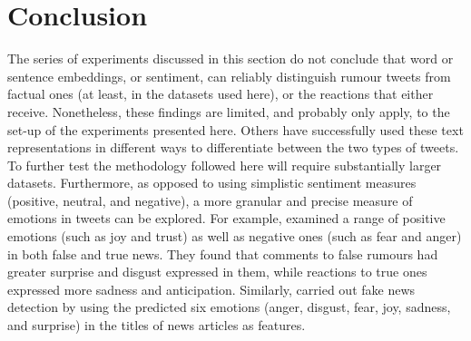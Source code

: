 \section{Conclusion}
\label{ssec:3-conclusion}

The series of experiments discussed in this section do not conclude that word or sentence embeddings, or sentiment, can reliably distinguish rumour tweets from factual ones (at least, in the datasets used here), or the reactions that either receive. Nonetheless, these findings are limited, and probably only apply, to the set-up of the experiments presented here. Others have successfully used these text representations in different ways to differentiate between the two types of tweets. To further test the methodology followed here will require substantially larger datasets. Furthermore, as opposed to using simplistic sentiment measures (positive, neutral, and negative), a more granular and precise measure of emotions in tweets can be explored. For example,  examined a range of positive emotions (such as joy and trust) as well as negative ones (such as fear and anger) in both false and true news. They found that comments to false rumours had greater surprise and disgust expressed in them, while reactions to true ones expressed more sadness and anticipation. Similarly,  carried out fake news detection by using the predicted six emotions (anger, disgust, fear, joy, sadness, and surprise) in the titles of news articles as features.


